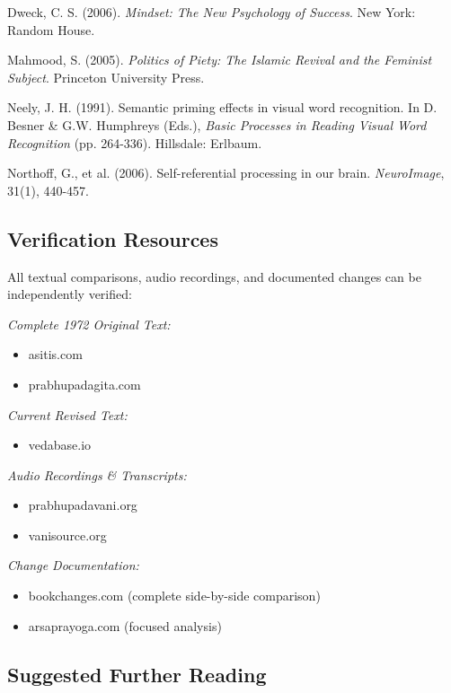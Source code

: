 \documentclass[12pt]{article}
\begin{document}
Dweck, C. S. (2006). \textit{Mindset: The New Psychology of Success}. New York: Random House.

Mahmood, S. (2005). \textit{Politics of Piety: The Islamic Revival and the Feminist Subject}. Princeton University Press.

Neely, J. H. (1991). Semantic priming effects in visual word recognition. In D. Besner \& G.W. Humphreys (Eds.), \textit{Basic Processes in Reading Visual Word Recognition} (pp. 264-336). Hillsdale: Erlbaum.

Northoff, G., et al. (2006). Self-referential processing in our brain. \textit{NeuroImage}, 31(1), 440-457.

\vspace{0.5cm}

\subsection*{Verification Resources}

All textual comparisons, audio recordings, and documented changes can be independently verified:

\textit{Complete 1972 Original Text:}
\begin{itemize}
\item asitis.com
\item prabhupadagita.com
\end{itemize}

\textit{Current Revised Text:}
\begin{itemize}
\item vedabase.io
\end{itemize}

\textit{Audio Recordings \& Transcripts:}
\begin{itemize}
\item prabhupadavani.org
\item vanisource.org
\end{itemize}

\textit{Change Documentation:}
\begin{itemize}
\item bookchanges.com (complete side-by-side comparison)
\item arsaprayoga.com (focused analysis)
\end{itemize}

\vspace{0.5cm}

\subsection*{Suggested Further Reading}
\end{document}
